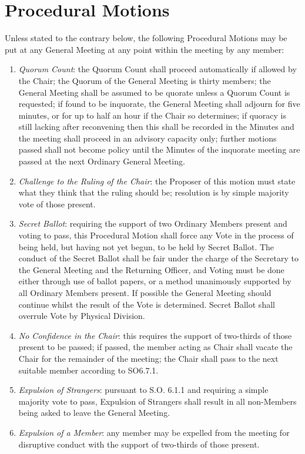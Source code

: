 \section{Procedural Motions}
\npara Unless stated to the contrary below, the following Procedural Motions may be put at any General Meeting at any point within the meeting by any member:
\begin{enumerate}
\item \textit{Quorum Count}: the Quorum Count shall proceed automatically if allowed by the Chair; the Quorum of the General Meeting is thirty members; the General Meeting shall be assumed to be quorate unless a Quorum Count is requested; if found to be inquorate, the General Meeting shall adjourn for five minutes, or for up to half an hour if the Chair so determines; if quoracy is still lacking after reconvening then this shall be recorded in the Minutes and the meeting shall proceed in an advisory capacity only; further motions passed shall not become policy until the Minutes of the inquorate meeting are passed at the next Ordinary General Meeting.
\item \textit{Challenge to the Ruling of the Chair}: the Proposer of this motion must state what they think that the ruling should be; resolution is by simple majority vote of those present.
\item \textit{Secret Ballot}: requiring the support of two Ordinary Members present and voting to pass, this Procedural Motion shall force any Vote in the process of being held, but having not yet begun, to be held by Secret Ballot. The conduct of the Secret Ballot shall be fair under the charge of the Secretary to the General Meeting and the Returning Officer, and Voting must be done either through use of ballot papers, or a method unanimously supported by all Ordinary Members present. If possible the General Meeting should continue whilst the result of the Vote is determined. Secret Ballot shall overrule Vote by Physical Division.
\item \textit{No Confidence in the Chair}: this requires the support of two-thirds of those present to be passed; if passed, the member acting as Chair shall vacate the Chair for the remainder of the meeting; the Chair shall pass to the next suitable member according to SO6.7.1.
\item \textit{Expulsion of Strangers}: pursuant to S.O. 6.1.1 and requiring a simple majority vote to pass, Expulsion of Strangers shall result in all non-Members being asked to leave the General Meeting.
\item \textit{Expulsion of a Member}: any member may be expelled from the meeting for disruptive conduct with the support of two-thirds of those present.

\end{enumerate}
